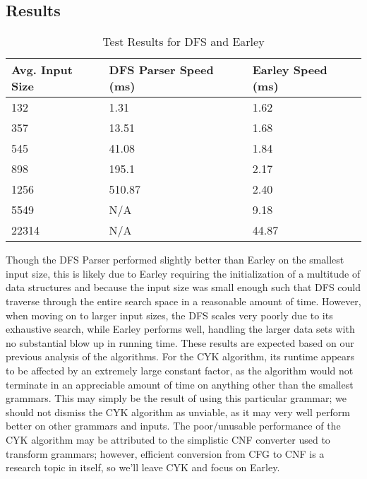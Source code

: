 \documentclass[a4paper, 11pt]{article}
\begin{document}
\subsection{Results}
\begin{table}[h]
\centering
  \begin{tabular}{ | l | l | l |}
    \hline
    Avg. Input Size & DFS Parser Speed (ms) & Earley Speed (ms) \\ \hline
    132 & 1.31 & 1.62 \\ \hline
    357 & 13.51 & 1.68 \\ \hline
    545 & 41.08 & 1.84 \\ \hline
    898 & 195.1 & 2.17 \\ \hline
    1256 & 510.87 & 2.40 \\\hline
    5549 & N/A & 9.18 \\ \hline
    22314 & N/A & 44.87 \\
    \hline
  \end{tabular}
 \caption{Test Results for DFS and Earley}
\end{table}

Though the DFS Parser performed slightly better than Earley on the smallest input size, this is likely due to Earley requiring the initialization of a multitude of data 
structures and because the input size was small enough such that DFS could traverse through the entire search space in a reasonable amount of time. However, when moving 
on to larger input sizes, the DFS scales very poorly due to its exhaustive search, while Earley performs well, handling the larger data sets with no substantial blow up 
in running time. These results are expected based on our previous analysis of the algorithms. For the CYK algorithm, its runtime appears to be affected by an extremely 
large constant factor, as the algorithm would not terminate in an appreciable amount of time on anything other than the smallest grammars. This may simply be the result
of using this particular grammar; we should not dismiss the CYK algorithm as unviable, as it may very well perform better on other grammars and inputs. The poor/unusable performance of the CYK algorithm may be attributed to the simplistic CNF converter used to transform grammars; however, efficient conversion 
from CFG to CNF is a research topic in itself, so we'll leave CYK and focus on Earley.
\end{document}
